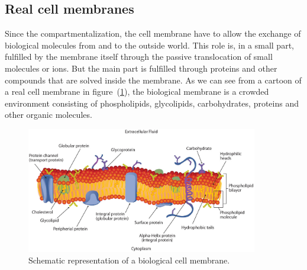 \subsection{Real cell membranes}
Since the compartmentalization, the cell membrane have to allow the exchange of biological molecules from and to the outside world. This role is, in a small part, fulfilled by the membrane itself through the passive translocation of small molecules or ions. But the main part is fulfilled through proteins and other compounds that are solved inside the membrane. As we can see from a cartoon of a real cell membrane in figure~(\ref{fig:cellMembrane}), the biological membrane is a crowded environment consisting of phospholipids, glycolipids, carbohydrates, proteins and other organic molecules.
\begin{figure}[!ht]
	\centering
	\includegraphics[width=0.9\textwidth]{./img/cellMembrane}
	\caption{Schematic representation of a biological cell membrane.}
	\label{fig:cellMembrane}
\end{figure}

